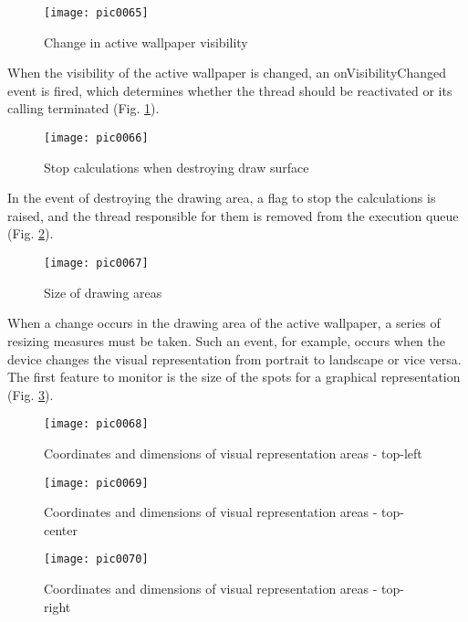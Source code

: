 \begin{figure}[h]
\centering
\texttt{[image: pic0065]}
\caption{Change in active wallpaper visibility}
\label{fig:pic0065}
\end{figure}
\FloatBarrier

When the visibility of the active wallpaper is changed, an onVisibilityChanged event is fired, which determines whether the thread should be reactivated or its calling terminated (Fig. \ref{fig:pic0065}).

\begin{figure}[h]
\centering
\texttt{[image: pic0066]}
\caption{Stop calculations when destroying draw surface}
\label{fig:pic0066}
\end{figure}
\FloatBarrier

In the event of destroying the drawing area, a flag to stop the calculations is raised, and the thread responsible for them is removed from the execution queue (Fig. \ref{fig:pic0066}).

\begin{figure}[h]
\centering
\texttt{[image: pic0067]}
\caption{Size of drawing areas}
\label{fig:pic0067}
\end{figure}
\FloatBarrier

When a change occurs in the drawing area of the active wallpaper, a series of resizing measures must be taken. Such an event, for example, occurs when the device changes the visual representation from portrait to landscape or vice versa. The first feature to monitor is the size of the spots for a graphical representation (Fig. \ref{fig:pic0067}).


\begin{figure}[h]
\centering
\texttt{[image: pic0068]}
\caption{Coordinates and dimensions of visual representation areas - top-left}
\label{fig:pic0068}
\end{figure}
\FloatBarrier

\begin{figure}[h]
\centering
\texttt{[image: pic0069]}
\caption{Coordinates and dimensions of visual representation areas - top-center}
\label{fig:pic0069}
\end{figure}
\FloatBarrier

\begin{figure}[h]
\centering
\texttt{[image: pic0070]}
\caption{Coordinates and dimensions of visual representation areas - top-right}
\label{fig:pic0070}
\end{figure}
\FloatBarrier

